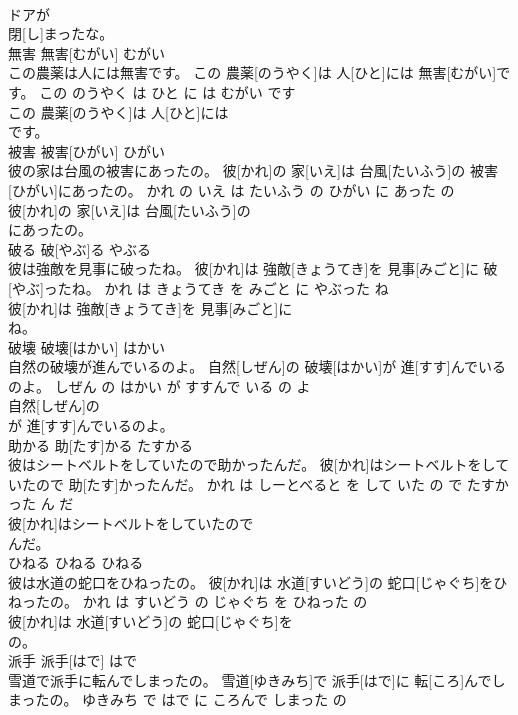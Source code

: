 \documentclass[8pt]{extreport}
\begin{document}
\begin{CJK}{UTF8}{min}
\\	ドアが
\\	閉[し]まったな。			
\\	無害	無害[むがい]	むがい	
\\	この農薬は人には無害です。	この 農薬[のうやく]は 人[ひと]には 無害[むがい]です。	この のうやく は ひと に は むがい です	
\\	この 農薬[のうやく]は 人[ひと]には
\\	です。			
\\	被害	被害[ひがい]	ひがい	
\\	彼の家は台風の被害にあったの。	彼[かれ]の 家[いえ]は 台風[たいふう]の 被害[ひがい]にあったの。	かれ の いえ は たいふう の ひがい に あった の	
\\	彼[かれ]の 家[いえ]は 台風[たいふう]の
\\	にあったの。			
\\	破る	破[やぶ]る	やぶる	
\\	彼は強敵を見事に破ったね。	彼[かれ]は 強敵[きょうてき]を 見事[みごと]に 破[やぶ]ったね。	かれ は きょうてき を みごと に やぶった ね	
\\	彼[かれ]は 強敵[きょうてき]を 見事[みごと]に
\\	ね。			
\\	破壊	破壊[はかい]	はかい	
\\	自然の破壊が進んでいるのよ。	自然[しぜん]の 破壊[はかい]が 進[すす]んでいるのよ。	しぜん の はかい が すすんで いる の よ	
\\	自然[しぜん]の
\\	が 進[すす]んでいるのよ。			
\\	助かる	助[たす]かる	たすかる	
\\	彼はシートベルトをしていたので助かったんだ。	彼[かれ]はシートベルトをしていたので 助[たす]かったんだ。	かれ は しーとべると を して いた の で たすかった ん だ	
\\	彼[かれ]はシートベルトをしていたので
\\	んだ。			
\\	ひねる	ひねる	ひねる	
\\	彼は水道の蛇口をひねったの。	彼[かれ]は 水道[すいどう]の 蛇口[じゃぐち]をひねったの。	かれ は すいどう の じゃぐち を ひねった の	
\\	彼[かれ]は 水道[すいどう]の 蛇口[じゃぐち]を
\\	の。			
\\	派手	派手[はで]	はで	
\\	雪道で派手に転んでしまったの。	雪道[ゆきみち]で 派手[はで]に 転[ころ]んでしまったの。	ゆきみち で はで に ころんで しまった の	

\end{CJK}
\end{document}
